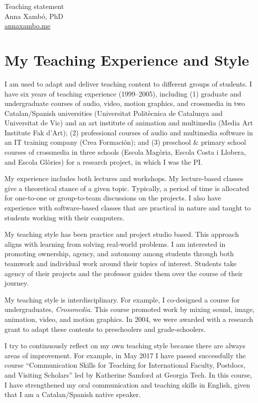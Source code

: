 \documentclass[10pt, a4paper]{article}
\begin{document}
{\LARGE Teaching statement}\\[0.2cm]
Anna Xambó, PhD\\
\href{http://annaxambo.me}{annaxambo.me}

\section*{My Teaching Experience and Style}

I am used to adapt and deliver teaching content to different groups of students. I have six years of teaching experience (1999--2005), including (1) graduate and undergraduate courses of audio, video, motion graphics, and crossmedia in two Catalan/Spanish universities (Universitat Politècnica de Catalunya and Universitat de Vic) and an art institute of animation and multimedia (Media Art Institute Fak d’Art); (2) professional courses of audio and multimedia software in an IT training company (Crea Formación); and (3) preschool \& primary school courses of crossmedia in three schools (Escola Magòria, Escola Costa i Llobera, and Escola Glòries) for a research project, in which I was the PI. 

My experience includes both lectures and workshops. My lecture-based classes give a theoretical stance of a given topic. Typically, a period of time is allocated for one-to-one or group-to-team discussions on the projects. I also have experience with software-based classes that are practical in nature and taught to students working with their computers. 

My teaching style has been practice and project studio based. This approach aligns with learning from solving real-world problems. I am interested in promoting ownership, agency, and autonomy among students through both teamwork and individual work around their topics of interest. Students take agency of their projects and the professor guides them over the course of their journey.

My teaching style is interdisciplinary. For example, I co-designed a course for undergraduates, \emph{Crossmedia}. This course promoted work by mixing sound, image, animation, video, and motion graphics. In 2004, we were awarded with a research grant to adapt these contents to preschoolers and grade-schoolers.

I try to continuously reflect on my own teaching style because there are always areas of improvement. For example, in May 2017 I have passed successfully the course ``Communication Skills for Teaching for International Faculty, Postdocs, and Visiting Scholars'' led by Katherine Samford at Georgia Tech. In this course, I have strengthened my oral communication and teaching skills in English, given that I am a Catalan/Spanish native speaker. 
\end{document}
